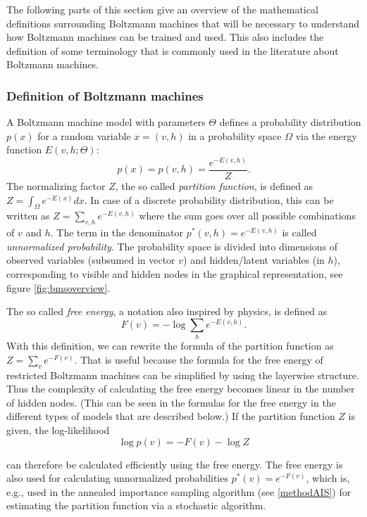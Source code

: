 \documentclass[12pt]{article}
\begin{document}
The following parts of this section give an overview of the mathematical definitions surrounding Boltzmann machines that will be necessary to understand how Boltzmann machines can be trained and used.
This also includes the definition of some terminology that is commonly used in the literature about Boltzmann machines.

\subsubsection{Definition of Boltzmann machines}\label{basicbmproperties}

A Boltzmann machine model with parameters $\Theta$ defines a probability distribution $p(x)$ for a random variable $x = (v, h)$ in a probability space $\Omega$ via the energy function $E(v, h; \Theta)$:
\begin{equation}
   p(x) = p(v, h) = \frac{e^{-E(v,h)}}{Z}.
   \label{eqn:probbm}
\end{equation}
The normalizing factor $Z$, the so called \emph{partition function}, is defined as $Z = \int_{\Omega} e^{-E(x)} dx$. In case of a discrete probability distribution, this can be written as $Z = \sum_{v,h}e^{-E(v,h)}$ where the sum goes over all possible combinations of $v$ and $h$.
The term in the denominator $p^*(v,h) = e^{-E(v,h)}$ is called \emph{unnormalized probability}.
The probability space is divided into dimensions of observed variables (subsumed in vector $v$) and hidden/latent variables (in $h$), corresponding to visible and hidden nodes in the graphical representation, see figure \ref{fig:bmsoverview}.

The so called \emph{free energy}, a notation also inspired by physics, is defined as
\[
   F(v) = - \log \sum_h e^{-E(v, h)}.
\]
With this definition, we can rewrite the formula of the partition function as $Z = \sum_v e^{-F(v)}$.
That is useful because the formula for the free energy of restricted Boltzmann machines can be simplified by using the layerwise structure.
Thus the complexity of calculating the free energy becomes linear in the number of hidden nodes. (This can be seen in the formulas for the free energy in the different types of models that are described below.)
If the partition function $Z$ is given, the log-likelihood
\begin{equation}
   \log p(v) = - F(v) - \log Z
\label{eqn:pRBMfreeenergy}
\end{equation}

can therefore be calculated efficiently using the free energy. The free energy is also used for calculating unnormalized probabilities $p^*(v) = e^{-F(v)}$, which is, e.g., used in the annealed importance sampling algorithm (see \ref{methodAIS}) for estimating the partition function via a stochastic algorithm.
\end{document}
